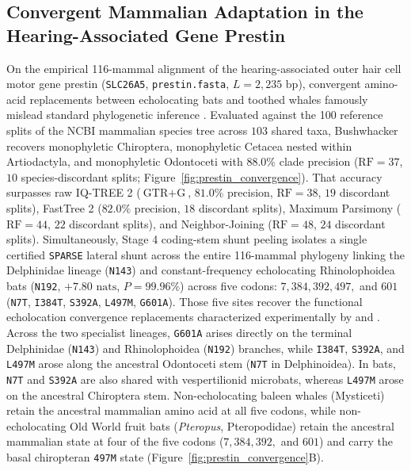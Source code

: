 \documentclass[11pt,a4paper]{article}
\begin{document}
\subsection{Convergent Mammalian Adaptation in the Hearing-Associated Gene Prestin}

On the empirical 116-mammal alignment of the hearing-associated outer hair cell motor gene prestin (\texttt{SLC26A5}, \texttt{prestin.fasta}, $L = 2,235\text{ bp}$), convergent amino-acid replacements between echolocating bats and toothed whales famously mislead standard phylogenetic inference \citep{liu2010convergent,li2010hearing}. Evaluated against the 100 reference splits of the NCBI mammalian species tree across $103$ shared taxa, Bushwhacker recovers monophyletic Chiroptera, monophyletic Cetacea nested within Artiodactyla, and monophyletic Odontoceti with $88.0\%$ clade precision ($\text{RF} = 37$, $10$ species-discordant splits; Figure~\ref{fig:prestin_convergence}). That accuracy surpasses raw IQ-TREE 2 ($\text{GTR}+\text{G}$, $81.0\%$ precision, $\text{RF} = 38$, $19$ discordant splits), FastTree 2 ($82.0\%$ precision, $18$ discordant splits), Maximum Parsimony ($\text{RF} = 44$, $22$ discordant splits), and Neighbor-Joining ($\text{RF} = 48$, $24$ discordant splits). Simultaneously, Stage 4 coding-stem shunt peeling isolates a single certified \texttt{SPARSE} lateral shunt across the entire 116-mammal phylogeny linking the Delphinidae lineage (\texttt{N143}) and constant-frequency echolocating Rhinolophoidea bats (\texttt{N192}, $+7.80\text{ nats}$, $P = 99.96\%$) across five codons: $7, 384, 392, 497,$ and $601$ (\texttt{N7T}, \texttt{I384T}, \texttt{S392A}, \texttt{L497M}, \texttt{G601A}). Those five sites recover the functional echolocation convergence replacements characterized experimentally by \citet{liu2010convergent} and \citet{li2010hearing}. Across the two specialist lineages, \texttt{G601A} arises directly on the terminal Delphinidae (\texttt{N143}) and Rhinolophoidea (\texttt{N192}) branches, while \texttt{I384T}, \texttt{S392A}, and \texttt{L497M} arose along the ancestral Odontoceti stem (\texttt{N7T} in Delphinoidea). In bats, \texttt{N7T} and \texttt{S392A} are also shared with vespertilionid microbats, whereas \texttt{L497M} arose on the ancestral Chiroptera stem. Non-echolocating baleen whales (Mysticeti) retain the ancestral mammalian amino acid at all five codons, while non-echolocating Old World fruit bats (\textit{Pteropus}, Pteropodidae) retain the ancestral mammalian state at four of the five codons ($7, 384, 392,$ and $601$) and carry the basal chiropteran \texttt{497M} state (Figure~\ref{fig:prestin_convergence}B).
\end{document}
